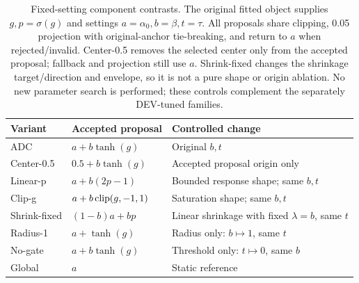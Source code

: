 \begin{table}[htbp]
\centering\footnotesize\setlength{\tabcolsep}{3pt}
\caption{Fixed-setting component contrasts. The original fitted object supplies $g,p=\sigma(g)$ and settings $a=\alpha_0,b=\beta,t=\tau$. All proposals share clipping, 0.05 projection with original-anchor tie-breaking, and return to $a$ when rejected/invalid. Center-0.5 removes the selected center only from the accepted proposal; fallback and projection still use $a$. Shrink-fixed changes the shrinkage target/direction and envelope, so it is not a pure shape or origin ablation. No new parameter search is performed; these controls complement the separately DEV-tuned families.}
\label{tab:component-design}
\begin{tabular}{lll}
\toprule
Variant & Accepted proposal & Controlled change\\
\midrule
ADC & $a+b\tanh(g)$ & Original $b,t$\\
Center-0.5 & $0.5+b\tanh(g)$ & Accepted proposal origin only\\
Linear-p & $a+b(2p-1)$ & Bounded response shape; same $b,t$\\
Clip-g & $a+b\operatorname{clip}(g,-1,1)$ & Saturation shape; same $b,t$\\
Shrink-fixed & $(1-b)a+bp$ & Linear shrinkage with fixed $\lambda=b$, same $t$\\
Radius-1 & $a+\tanh(g)$ & Radius only: $b\mapsto1$, same $t$\\
No-gate & $a+b\tanh(g)$ & Threshold only: $t\mapsto0$, same $b$\\
Global & $a$ & Static reference\\
\bottomrule
\end{tabular}
\end{table}
